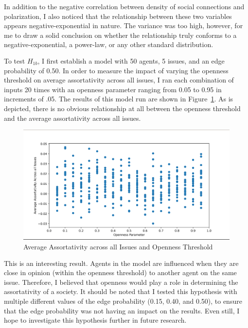 In addition to the negative correlation between density of social connections
and polarization, I also noticed that the relationship between these two variables
appears negative-exponential in nature. The variance was too high, however, for
me to draw a solid conclusion on whether the relationship truly conforms to a
negative-exponential, a power-law, or any other standard distribution.

To test $H_{1b}$, I first establish a model with 50 agents, 5 issues, and an
edge probability of 0.50. In order to measure the impact of varying the
openness threshold on average assortativity across all issues, I ran each
combination of inputs 20 times with an openness parameter ranging from 0.05 to
0.95 in increments of .05. The results of this model run are shown in
Figure~\ref{H1b_plot}. As is depicted, there is no obvious relationship at all
between the openness threshold and the average assortativity across all issues. 

\begin{figure}
\centering
\includegraphics[width=1.0\columnwidth]{./Graphs/Assort_openness.png}
\caption{Average Assortativity across all Issues and Openness Threshold}
\label{H1b_plot}
\end{figure}

This is an interesting result. Agents in the model are influenced when they are
close in opinion (within the openness threshold) to another agent on the same
issue. Therefore, I believed that openness would play a role in determining the assortativity of a society. 
It should be noted that I tested this hypothesis with multiple different values of the edge probability (0.15,
0.40, and 0.50), to ensure that the edge probability was not having an impact
on the results. Even still, I hope to investigate this hypothesis further in future research. 

